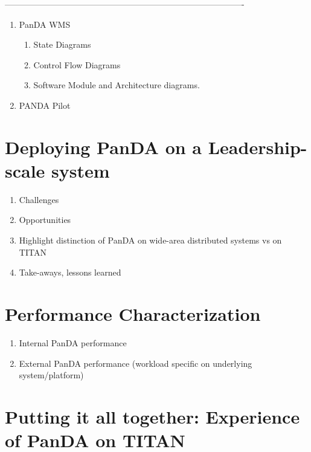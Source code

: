 \documentclass[10pt, conference, compsocconf]{IEEEtran}
\begin{document}
-------------------------------------------------------------------------------------
\begin{enumerate}
  \item PanDA WMS
  \begin{enumerate}
    \item State Diagrams
    \item Control Flow Diagrams
    \item Software Module and Architecture diagrams.
  \end{enumerate}
  \item PANDA Pilot
\end{enumerate}

\section{Deploying PanDA on a Leadership-scale system}
\label{sec:panda_deployment}

\begin{enumerate}
  \item Challenges
  \item Opportunities
  \item Highlight distinction of PanDA on wide-area distributed systems vs on TITAN
  \item Take-aways, lessons learned
\end{enumerate}

\section{Performance Characterization}
\label{sec:panda_performance}

\begin{enumerate}
  \item Internal PanDA performance
  \item External PanDA performance (workload specific on underlying system/platform)
\end{enumerate}

\section{Putting it all together: Experience of PanDA on TITAN} %
\label{sec:panda_titan}
\end{document}
